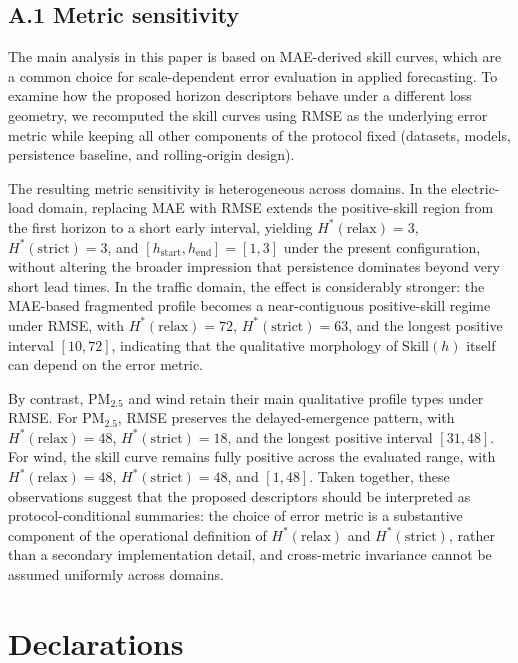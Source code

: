 \documentclass[pdflatex]{sn-jnl}
\begin{document}
\appendix

\subsection*{A.1 Metric sensitivity}

The main analysis in this paper is based on MAE-derived skill curves, which are a common choice for scale-dependent error evaluation in applied forecasting. To examine how the proposed horizon descriptors behave under a different loss geometry, we recomputed the skill curves using RMSE as the underlying error metric while keeping all other components of the protocol fixed (datasets, models, persistence baseline, and rolling-origin design).

The resulting metric sensitivity is heterogeneous across domains. In the electric-load domain, replacing MAE with RMSE extends the positive-skill region from the first horizon to a short early interval, yielding $H^*(\mathrm{relax})=3$, $H^*(\mathrm{strict})=3$, and $[h_{\mathrm{start}},h_{\mathrm{end}}]=[1,3]$ under the present configuration, without altering the broader impression that persistence dominates beyond very short lead times. In the traffic domain, the effect is considerably stronger: the MAE-based fragmented profile becomes a near-contiguous positive-skill regime under RMSE, with $H^*(\mathrm{relax})=72$, $H^*(\mathrm{strict})=63$, and the longest positive interval $[10,72]$, indicating that the qualitative morphology of $\mathrm{Skill}(h)$ itself can depend on the error metric.

By contrast, PM$_{2.5}$ and wind retain their main qualitative profile types under RMSE. For PM$_{2.5}$, RMSE preserves the delayed-emergence pattern, with $H^*(\mathrm{relax})=48$, $H^*(\mathrm{strict})=18$, and the longest positive interval $[31,48]$. For wind, the skill curve remains fully positive across the evaluated range, with $H^*(\mathrm{relax})=48$, $H^*(\mathrm{strict})=48$, and $[1,48]$. Taken together, these observations suggest that the proposed descriptors should be interpreted as protocol-conditional summaries: the choice of error metric is a substantive component of the operational definition of $H^*(\mathrm{relax})$ and $H^*(\mathrm{strict})$, rather than a secondary implementation detail, and cross-metric invariance cannot be assumed uniformly across domains.

\section*{Declarations}
\end{document}
